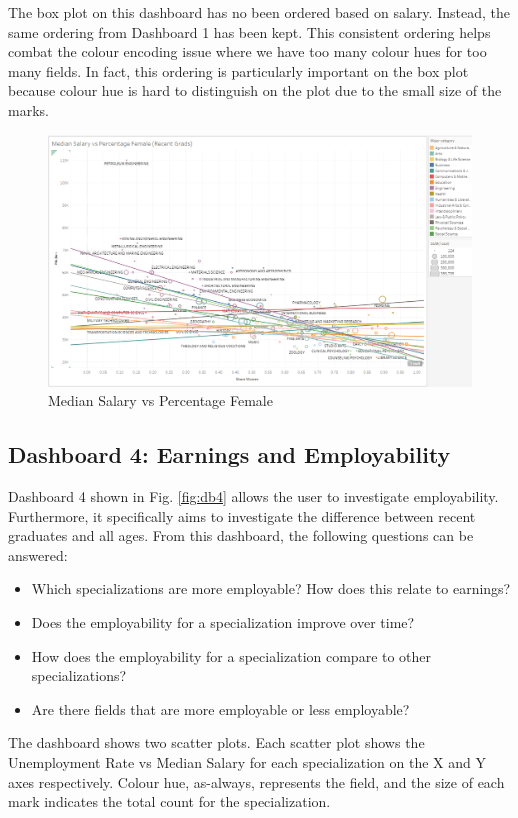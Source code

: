 \documentclass[sigchi]{acmart}
\begin{document}
The box plot on this dashboard has no been ordered based on salary. Instead, the same ordering from Dashboard 1 has been kept. This consistent ordering helps combat the colour encoding issue where we have too many colour hues for too many fields. In fact, this ordering is particularly important on the box plot because colour hue is hard to distinguish on the plot due to the small size of the marks.

  \begin{figure}[thpb]
  \includegraphics[width=1.0\textwidth]{SP1.png}
     \caption{Median Salary vs Percentage Female}
         \label{fig:sp1}
  \end{figure}


\subsection{Dashboard 4: Earnings and Employability}
\label{sec:db4}

Dashboard 4 shown in Fig. \ref{fig:db4} allows the user to investigate employability. Furthermore, it specifically aims to investigate the difference between recent graduates and all ages. From this dashboard, the following questions can be answered:
\begin{itemize}
\item{Which specializations are more employable? How does this relate to earnings?}
\item{Does the employability for a specialization improve over time?}
\item{How does the employability for a specialization compare to other specializations?}
\item{Are there fields that are more employable or less employable?}
\end{itemize}
The dashboard shows two scatter plots. Each scatter plot shows the Unemployment Rate vs Median Salary for each specialization on the X and Y axes respectively. Colour hue, as-always, represents the field, and the size of each mark indicates the total count for the specialization. 
\end{document}
